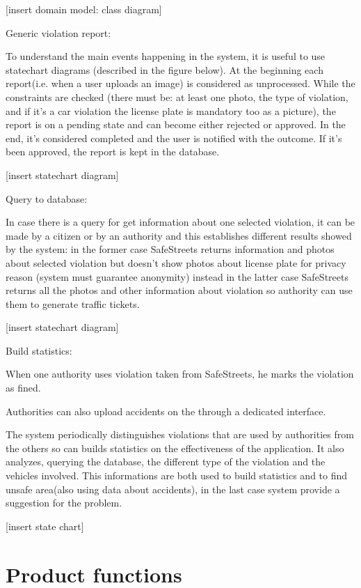\documentclass[a4paper, hidelinks, 12pt]{report}
\begin{document}
	    [insert domain model: class diagram]

	    Generic violation report:

	    To understand the main events happening in the system, it is useful to use statechart diagrams (described in the figure below). At the beginning each report(i.e. when a user uploads an image) is considered as unprocessed. While the constraints are checked (there must be: at least one photo, the type of violation, and if it’s a car violation the license plate is mandatory too as a picture), the report is on a pending state and can become either rejected or approved. In the end, it’s considered completed and the user is notified with the outcome. If it’s been approved, the report is kept in the database.

	    [insert statechart diagram]

	    Query to database:

    	In case there is a query for get information about one selected violation, it can be made by a citizen or by an authority and this establishes different results showed by the system: in the former case SafeStreets returns information and photos about selected violation but doesn’t show photos about license plate for privacy reason (system must guarantee anonymity) instead in the latter case SafeStreets returns all the photos and other information about violation so authority can use them to generate traffic tickets.

    	[insert statechart diagram]

	    Build statistics:

	    When one authority uses violation taken from SafeStreets, he marks the violation as fined.

	    Authorities can also upload accidents on the through a dedicated interface.

	    The system periodically distinguishes violations that are used by authorities from the others so can builds statistics on the effectiveness of the application. It also analyzes, querying the database, the different type of the violation and the vehicles involved. This informations are both used to build statistics and to find unsafe area(also using data about accidents), in the last case system provide a suggestion for the problem.

	    [insert state chart]
        \section{Product functions}\label{sec:product-functions}
\end{document}
